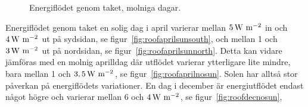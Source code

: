 \begin{figure}[hpbt]
\centering
{}

\caption{\label{fig:rooffigurescloud}Energiflödet genom taket, molniga dagar.}
\end{figure}

Energiflödet genom taket en solig dag i april varierar mellan $\unit[5]{W~m^{-2}}$ in och $\unit[4]{W~m^{-2}}$ ut på sydsidan, se figur~\ref{fig:roofaprilsunsouth}, och mellan 1 och $\unit[3]{W~m^{-2}}$ ut på nordsidan, se figur~\ref{fig:roofaprilsunnorth}. Detta kan vidare jämföras med en molnig aprilldag där utflödet varierar ytterligare lite mindre, bara mellan 1 och $\unit[3,5]{W~m^{-2}}$, se figur~\ref{fig:roofaprilnosun}. Solen har alltså stor påverkan på energiflödets variationer. En dag i december är energiutflödet endast något högre och varierar mellan 6 och $\unit[4]{W~m^{-2}}$, se figur~\ref{fig:roofdecnosun},


